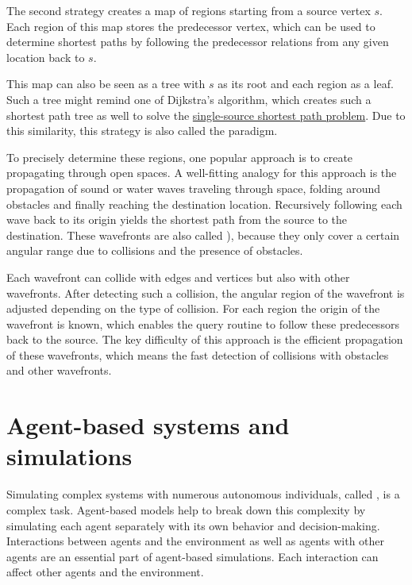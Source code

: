 		The second strategy creates a map of regions starting from a source vertex $s$.
		Each region of this map stores the predecessor vertex, which can be used to determine shortest paths by following the predecessor relations from any given location back to $s$.

		This map can also be seen as a tree with $s$ as its root and each region as a leaf.
		Such a tree might remind one of Dijkstra's algorithm, which creates such a shortest path tree as well to solve the \hyperref[subsubsec:single-source-shortest-path]{single-source shortest path problem}.
		Due to this similarity, this strategy is also called the  paradigm\cite{mitchell-discrete-geodesic}.
		
		To precisely determine these regions, one popular approach is to create  propagating through open spaces.
		A well-fitting analogy for this approach is the propagation of sound or water waves traveling through space, folding around obstacles and finally reaching the destination location.
		Recursively following each wave back to its origin yields the shortest path from the source to the destination.
		These wavefronts are also called ), because they only cover a certain angular range due to collisions and the presence of obstacles.
		
		Each wavefront can collide with edges and vertices but also with other wavefronts.
		After detecting such a collision, the angular region of the wavefront is adjusted depending on the type of collision.
		For each region the origin of the wavefront is known, which enables the query routine to follow these predecessors back to the source.
		The key difficulty of this approach is the efficient propagation of these wavefronts, which means the fast detection of collisions with obstacles and other wavefronts\cite{hershberger-suri}.

\section{Agent-based systems and simulations}

	Simulating complex systems with numerous autonomous individuals, called , is a complex task.
	Agent-based models help to break down this complexity by simulating each agent separately with its own behavior and decision-making\cite{macal-introductory-tutorial}.
	Interactions between agents and the environment as well as agents with other agents are an essential part of agent-based simulations.
	Each interaction can affect other agents and the environment.
	
